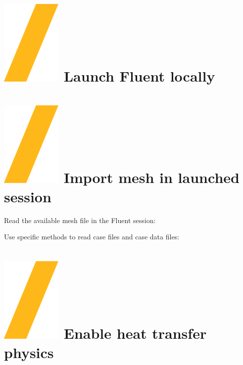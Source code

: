 \documentclass[9pt,landscape]{article}
\begin{document}
\begin{multicols}{3}
\setlength{\premulticols}{1pt}
\setlength{\postmulticols}{1pt}
\setlength{\multicolsep}{1pt}
\setlength{\columnsep}{2pt}

\vfill
\section{\includegraphics[height=\fontcharht\font`\S]{slash.png} Launch Fluent locally}


\section{\includegraphics[height=\fontcharht\font`\S]{slash.png} Import mesh in launched session}

Read the available mesh file in the Fluent session:


Use specific methods to read case files and case data files:



\section{\includegraphics[height=\fontcharht\font`\S]{slash.png} Enable heat transfer physics}


\end{multicols}
\end{document}
